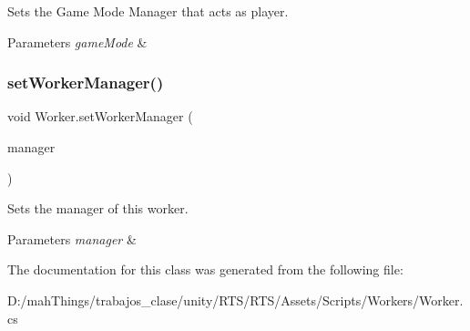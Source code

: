 Sets the Game Mode Manager that acts as player. 


\begin{DoxyParams}{Parameters}
{\em game\+Mode} & \\
\hline
\end{DoxyParams}
\mbox{\label{class_worker_a72be600dcec9d710cfc8ab1cc42044d6}} 
\subsubsection{\texorpdfstring{set\+Worker\+Manager()}{setWorkerManager()}}
{\footnotesize\ttfamily void Worker.\+set\+Worker\+Manager (\begin{DoxyParamCaption}\item[{\mbox{\hyperlink{class_workers_manager}{Workers\+Manager}}}]{manager }\end{DoxyParamCaption})}



Sets the manager of this worker. 


\begin{DoxyParams}{Parameters}
{\em manager} & \\
\hline
\end{DoxyParams}


The documentation for this class was generated from the following file\+:\begin{DoxyCompactItemize}
\item 
D\+:/mah\+Things/trabajos\+\_\+clase/unity/\+R\+T\+S/\+R\+T\+S/\+Assets/\+Scripts/\+Workers/Worker.\+cs\end{DoxyCompactItemize}

